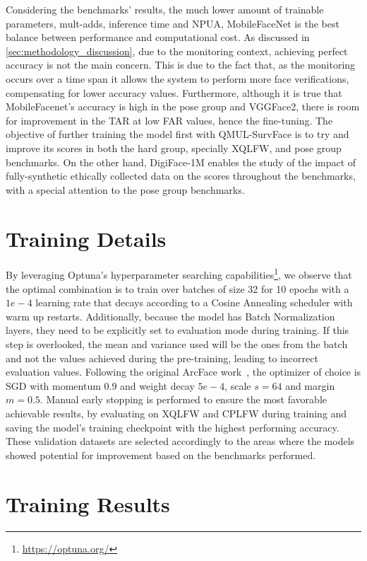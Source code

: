 \documentclass[class=report, crop=false, a4paper, 12pt]{standalone}
\begin{document}
\par Considering the benchmarks' results, the much lower amount of trainable parameters, mult-adds, inference time and NPUA, MobileFaceNet is the best balance between performance and computational cost. As discussed in \autoref{sec:methodology_discussion}, due to the monitoring context, achieving perfect accuracy is not the main concern. This is due to the fact that, as the monitoring occurs over a time span it allows the system to perform more face verifications, compensating for lower accuracy values.
Furthermore, although it is true that MobileFacenet's accuracy is high in the pose group and VGGFace2, there is room for improvement in the TAR at low FAR values, hence the fine-tuning. The objective of further training the model first with QMUL-SurvFace is to try and improve its scores in both the hard group, specially XQLFW, and pose group benchmarks. On the other hand, DigiFace-1M enables the study of the impact of fully-synthetic ethically collected data on the scores throughout the benchmarks, with a special attention to the pose group benchmarks. 


\section{Training Details}
By leveraging Optuna's hyperparameter searching capabilities\footnote{\url{https://optuna.org/}}, we observe that the optimal combination is to train over batches of size 32 for 10 epochs with a $1e-4$ learning rate that decays according to a Cosine Annealing scheduler with warm up restarts. Additionally, because the model has Batch Normalization layers, they need to be explicitly set to evaluation mode during training. If this step is overlooked, the mean and variance used will be the ones from the batch and not the values achieved during the pre-training, leading to incorrect evaluation values. Following the original ArcFace work~\autocite{dengArcFaceAdditiveAngular}, the optimizer of choice is SGD with momentum $0.9$ and weight decay $5e-4$, scale $s=64$ and margin $m=0.5$. Manual early stopping is performed to ensure the most favorable achievable results, by evaluating on XQLFW and CPLFW during training and saving the model's training checkpoint with the highest performing accuracy. These validation datasets are selected accordingly to the areas where the models showed potential for improvement based on the benchmarks performed.

\section{Training Results}
\end{document}
